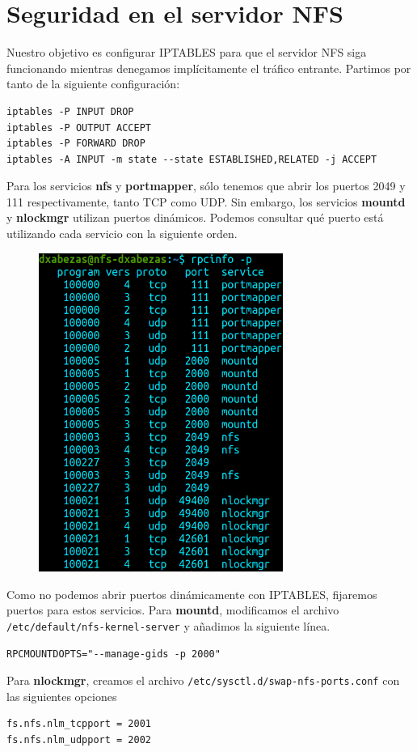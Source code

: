 \documentclass{article}
\begin{document}
\section{Seguridad en el servidor NFS}

Nuestro objetivo es configurar IPTABLES para que el servidor NFS siga funcionando mientras denegamos implícitamente el tráfico entrante.
Partimos por tanto de la siguiente configuración:
\begin{Verbatim}
iptables -P INPUT DROP
iptables -P OUTPUT ACCEPT
iptables -P FORWARD DROP
iptables -A INPUT -m state --state ESTABLISHED,RELATED -j ACCEPT
\end{Verbatim}

Para los servicios \textbf{nfs} y \textbf{portmapper}, sólo tenemos que abrir los puertos 2049 y 111 respectivamente, tanto TCP como UDP.
Sin embargo, los servicios \textbf{mountd} y \textbf{nlockmgr} utilizan puertos dinámicos. Podemos consultar qué puerto está utilizando cada servicio
con la siguiente orden.

\begin{figure}[H]
	\centering
	\includegraphics[width=80mm]{imgs/rpcinfo1}
\end{figure}

Como no podemos abrir puertos dinámicamente con IPTABLES, fijaremos puertos para estos servicios. Para \textbf{mountd}, modificamos el archivo
\texttt{/etc/default/nfs-kernel-server} y añadimos la siguiente línea.
\begin{Verbatim}
RPCMOUNTDOPTS="--manage-gids -p 2000"
\end{Verbatim}
Para \textbf{nlockmgr}, creamos el archivo \texttt{/etc/sysctl.d/swap-nfs-ports.conf} con las siguientes opciones
\begin{Verbatim}
fs.nfs.nlm_tcpport = 2001
fs.nfs.nlm_udpport = 2002
\end{Verbatim}
\end{document}

